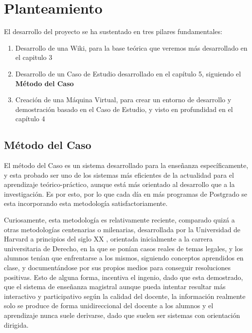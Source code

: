 
\section{Planteamiento}

El desarrollo del proyecto se ha sustentado en tres pilares fundamentales:

\begin{enumerate}
	\item Desarrollo de una Wiki, para la base teórica que veremos más desarrollado en el capitulo 3
	\item Desarrollo de un Caso de Estudio desarrollado en el capítulo 5, siguiendo el \textbf{Método del Caso}
	\item Creación de una Máquina Virtual, para crear un entorno de desarrollo y demostración basado en el Caso de Estudio, y visto en profundidad en el capítulo 4
\end{enumerate}

\subsection{Método del Caso}

El método del Caso es un sistema desarrollado para la enseñanza específicamente, y esta probado ser uno de los sistemas más eficientes de la actualidad para el aprendizaje teórico-práctico, aunque está más orientado al desarrollo que a la investigación. Es por esto, por lo que cada día en más programas de Postgrado se esta incorporando esta metodología satisfactoriamente.

Curiosamente, esta metodología es relativamente reciente, comparado quizá a otras metodologías centenarias o milenarias, desarrollada por la Universidad de Harvard\cite{website:hbsp} a principios del siglo XX \cite{website:voipinfo}, orientada inicialmente a la carrera universitaria de Derecho, en la que se ponían casos reales de temas legales, y los alumnos tenían que enfrentarse a los mismos, siguiendo conceptos aprendidos en clase, y documentándose por sus propios medios para conseguir resoluciones positivas. Esto de alguna forma, incentiva el ingenio, dado que esta demostrado, que el sistema de enseñanza magistral aunque pueda intentar resultar más interactivo y participativo según la calidad del docente, la información realmente solo se produce de forma unidireccional del docente a los alumnos y el aprendizaje nunca suele derivarse, dado que suelen ser sistemas con orientación dirigida.

